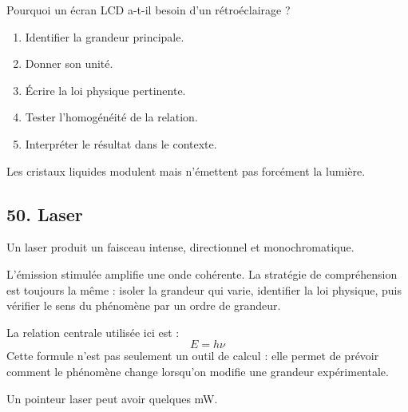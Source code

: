 \documentclass[11pt,a4paper]{article}
\begin{document}
\begin{exercicebox}
Pourquoi un écran LCD a-t-il besoin d'un rétroéclairage ?
\begin{enumerate}
  \item Identifier la grandeur principale.
  \item Donner son unité.
  \item Écrire la loi physique pertinente.
  \item Tester l'homogénéité de la relation.
  \item Interpréter le résultat dans le contexte.
\end{enumerate}
\end{exercicebox}

\begin{corrigebox}[Indication]
Les cristaux liquides modulent mais n'émettent pas forcément la lumière.
\end{corrigebox}


\subsection{50. Laser}

\begin{exemplebox}
Un laser produit un faisceau intense, directionnel et monochromatique.
\end{exemplebox}

\begin{methodebox}
L'émission stimulée amplifie une onde cohérente.
La stratégie de compréhension est toujours la même : isoler la grandeur qui varie, identifier la loi physique, puis vérifier le sens du phénomène par un ordre de grandeur.
\end{methodebox}

\begin{theorembox}
La relation centrale utilisée ici est :
\[
E=h\nu
\]
Cette formule n'est pas seulement un outil de calcul : elle permet de prévoir comment le phénomène change lorsqu'on modifie une grandeur expérimentale.
\end{theorembox}

\begin{odgbox}
Un pointeur laser peut avoir quelques mW.
\end{odgbox}
\end{document}
